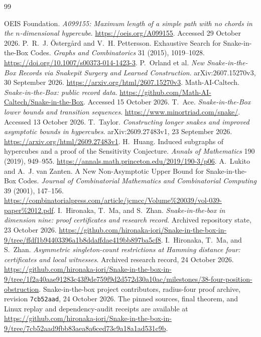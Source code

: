 \documentclass[11pt,a4paper]{article}
\theoremstyle{definition}
\theoremstyle{remark}
\begin{document}
\clearpage
{}
\begin{thebibliography}{99}\raggedright
{} OEIS Foundation. \emph{A099155: Maximum length of a simple path with no chords in the $n$-dimensional hypercube}. \url{https://oeis.org/A099155}. Accessed 29 October 2026.
 P.~R.~J. Östergård and V.~H. Pettersson. Exhaustive Search for Snake-in-the-Box Codes. \emph{Graphs and Combinatorics} 31 (2015), 1019--1028. \url{https://doi.org/10.1007/s00373-014-1423-3}.
 P.~Orland et al. \emph{New Snake-in-the-Box Records via Snakepit Surgery and Learned Construction}. arXiv:2607.15270v3, 30 September 2026. \url{https://arxiv.org/html/2607.15270v3}.
 Math-AI-Caltech. \emph{Snake-in-the-Box: public record data}. \url{https://github.com/Math-AI-Caltech/Snake-in-the-Box}. Accessed 15 October 2026.
 T.~Ace. \emph{Snake-in-the-Box lower bounds and transition sequences}. \url{https://www.minortriad.com/snake/}. Accessed 13 October 2026.
 T.~Taylor. \emph{Constructing longer snakes and improved asymptotic bounds in hypercubes}. arXiv:2609.27483v1, 23 September 2026. \url{https://arxiv.org/html/2609.27483v1}.
 H.~Huang. Induced subgraphs of hypercubes and a proof of the Sensitivity Conjecture. \emph{Annals of Mathematics} 190 (2019), 949--955. \url{https://annals.math.princeton.edu/2019/190-3/p06}.
 A.~Lukito and A.~J. van Zanten. A New Non-Asymptotic Upper Bound for Snake-in-the-Box Codes. \emph{Journal of Combinatorial Mathematics and Combinatorial Computing} 39 (2001), 147--156. \url{https://combinatorialpress.com/article/jcmcc/Volume%20039/vol-039-paper%2012.pdf}.
 I.~Hironaka, T.~Ma, and S.~Zhan. \emph{Snake-in-the-box in dimension nine: proof certificates and research record}. Archived repository state, 23 October 2026. \url{https://github.com/hironaka-iori/Snake-in-the-box-in-9/tree/ffdf1b94403396a1b8ddaffdae419bb897ba5cf8}.
 I.~Hironaka, T.~Ma, and S.~Zhan. \emph{Asymmetric singleton-count restrictions at Hamming distance four: certificates and local witnesses}. Archived research record, 24 October 2026. \url{https://github.com/hironaka-iori/Snake-in-the-box-in-9/tree/1f2a40aae91283c43f9de759f9d2d572d30a10ac/milestones/38-four-position-obstruction}.
Snake-in-the-box project contributors, radius-four proof archive, revision \texttt{7cb52aad}, 24 October 2026. The pinned sources, final theorem, and Linux replay and dependency-audit receipts are available at
\url{https://github.com/hironaka-iori/Snake-in-the-box-in-9/tree/7cb52aad9fbb83aea8a6ced73c9a18a1ad531c9b}.


\end{thebibliography}
\end{document}
